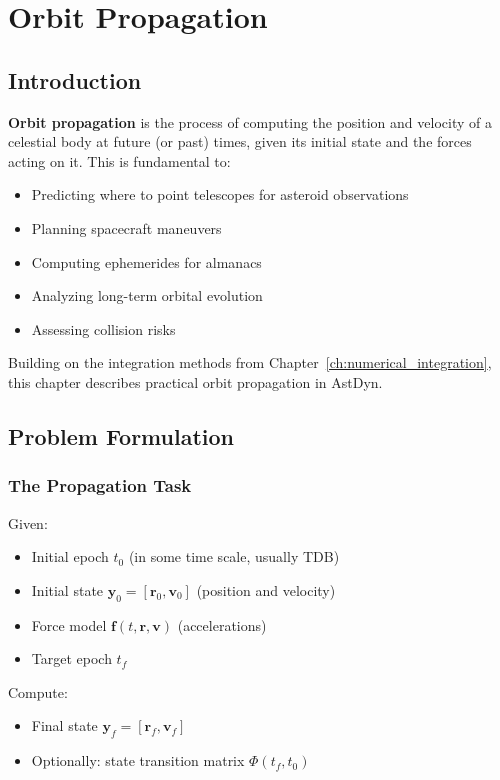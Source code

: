 \chapter{Orbit Propagation}
\label{ch:orbit_propagation}

\section{Introduction}

\textbf{Orbit propagation} is the process of computing the position and velocity of a celestial body at future (or past) times, given its initial state and the forces acting on it. This is fundamental to:

\begin{itemize}
    \item Predicting where to point telescopes for asteroid observations
    \item Planning spacecraft maneuvers
    \item Computing ephemerides for almanacs
    \item Analyzing long-term orbital evolution
    \item Assessing collision risks
\end{itemize}

Building on the integration methods from Chapter~\ref{ch:numerical_integration}, this chapter describes practical orbit propagation in AstDyn.

\section{Problem Formulation}

\subsection{The Propagation Task}

Given:
\begin{itemize}
    \item Initial epoch $t_0$ (in some time scale, usually TDB)
    \item Initial state $\mathbf{y}_0 = [\mathbf{r}_0, \mathbf{v}_0]$ (position and velocity)
    \item Force model $\mathbf{f}(t, \mathbf{r}, \mathbf{v})$ (accelerations)
    \item Target epoch $t_f$
\end{itemize}

Compute:
\begin{itemize}
    \item Final state $\mathbf{y}_f = [\mathbf{r}_f, \mathbf{v}_f]$
    \item Optionally: state transition matrix $\Phi(t_f, t_0)$
\end{itemize}

